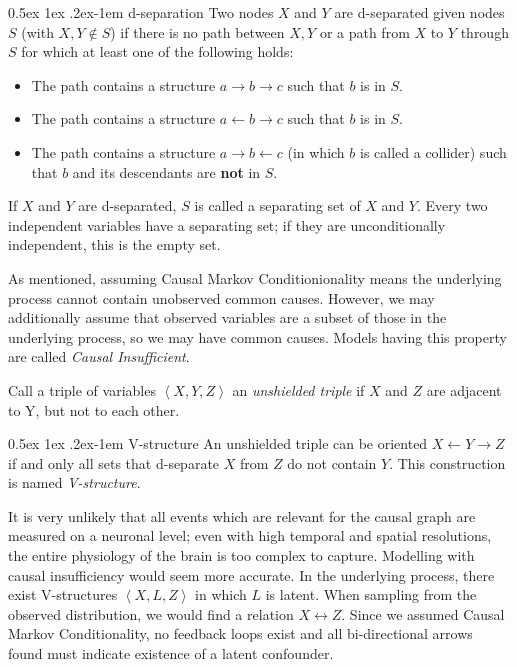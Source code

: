 \documentclass[a4paper, 10pt, english, onecolumn]{article}
\makeatletter
\renewcommand{\paragraph}{%
  \@startsection{paragraph}{4}%
  {\z@}{0.5ex \@plus 1ex \@minus .2ex}{-1em}%
  {\normalfont\normalsize\bfseries}%
}
\makeatother
\begin{document}
\paragraph{d-separation}
Two nodes $X$ and $Y$ are d-separated given nodes $S$ (with $X, Y \notin S$) if there is no path between $X,Y$ or a path from $X$ to $Y$ through $S$ for which at least one of the following holds:
\begin{itemize}
\item The path contains a structure $a \rightarrow b \rightarrow c$ such that $b$ is in $S$.
\item The path contains a structure $a \leftarrow b \rightarrow c$ such that $b$ is in $S$.
\item The path contains a structure $a \rightarrow b \leftarrow c$ (in which $b$ is called a collider) such that $b$ and its descendants are \textbf{not} in $S$.
\end{itemize}
If $X$ and $Y$ are d-separated, $S$ is called a separating set of $X$ and $Y$.
Every two independent variables have a separating set; if they are unconditionally independent, this is the empty set.

As mentioned, assuming Causal Markov Conditionionality means the underlying process cannot contain unobserved common causes.
However, we may additionally assume that observed variables are a subset of those in the underlying process, so we may have common causes.
Models having this property are called \textit{Causal Insufficient}.

Call a triple of variables $\left < X,Y,Z \right >$ an \textit{unshielded triple} if $X$ and $Z$ are adjacent to Y, but not to each other.

\paragraph{V-structure}
An unshielded triple can be oriented $X \leftarrow Y \rightarrow Z$ if and only all sets that d-separate $X$ from $Z$ do not contain $Y$.
This construction is named \textit{V-structure}.

It is very unlikely that all events which are relevant for the causal graph are measured on a neuronal level; 
even with high temporal and spatial resolutions, the entire physiology of the brain is too complex to capture.
Modelling with causal insufficiency would seem more accurate.
In the underlying process, there exist V-structures $\left <X,L,Z \right>$ in which $L$ is latent.
When sampling from the observed distribution, we would find a relation $X \leftrightarrow Z$.
Since we assumed Causal Markov Conditionality, no feedback loops exist and all bi-directional arrows found must indicate existence of a latent confounder.
\end{document}

